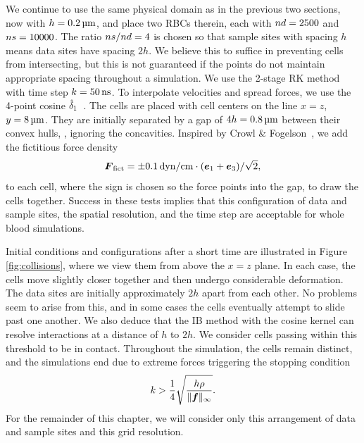 We continue to use the same physical domain as in the previous two sections, now with
$h = 0.2\um$, and place two RBCs therein, each with $\data\cardinality=2500$ and
$\sample\cardinality=10000$. The ratio $\sample\cardinality/\data\cardinality=4$ is
chosen so that sample sites with spacing $h$ means data sites have spacing $2h$. We
believe this to suffice in preventing cells from intersecting, but this is not guaranteed
if the points do not maintain appropriate spacing throughout a simulation. We use the
2-stage RK method with time step $\timestep = 50\ns$. To interpolate velocities and
spread forces, we use the 4-point cosine $\hat{\delta}_1$~\cite{Peskin:2002go}. The cells are
placed with cell centers on the line $x = z$, $y = 8\um$. They are initially separated by
a gap of $4h = 0.8\um$ between their convex hulls, , ignoring the
concavities. Inspired by Crowl \& Fogelson~\cite{Erickson:2011cf}, we add the fictitious
force density
\begin{equation*}
    \F_\text{fict} = \pm 0.1\dynpercm\cdot(\e_1+\e_3)/\sqrt{2},
\end{equation*}
to each cell, where the sign is chosen so the force points into the gap, to draw the
cells together. Success in these tests implies that this configuration of data and sample
sites, the spatial resolution, and the time step are acceptable for whole blood
simulations.

Initial conditions and configurations after a short time are illustrated in Figure~%
\ref{fig:collisions}, where we view them from above the $x=z$ plane. In each case, the
cells move slightly closer together and then undergo considerable deformation. The data
sites are initially approximately $2h$ apart from each other. No problems seem to arise
from this, and in some cases the cells eventually attempt to slide past one another.  We
also deduce that the IB method with the cosine kernel can resolve interactions at a
distance of $h$ to $2h$. We consider cells passing within this threshold to be in
contact. Throughout the simulation, the cells remain distinct, and the simulations end
due to extreme forces triggering the stopping condition~\cite{Agresar:1998wv}
\begin{equation}
    k > \frac14\sqrt{\frac{h\rho}{\|\boldsymbol{f}\|_\infty}}.
\end{equation}
For the remainder of this chapter, we will consider only this arrangement of data and
sample sites and this grid resolution.
